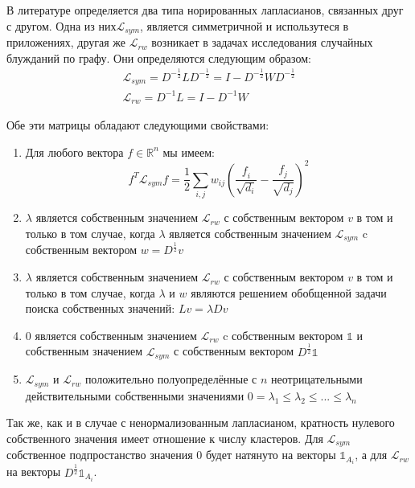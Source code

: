 В литературе определяется два типа норированных лапласианов, связанных друг с другом. Одна из них$\mathcal{L}_{sym}$, является симметричной и  использутеся в приложениях, другая же $\mathcal{L}_{rw}$ возникает в задачах исследования случайных блужданий по графу. Они определяются следующим образом:
\begin{equation}
\begin{array}{l}
	\mathcal{L}_{sym} = D^{-\frac12} L D^{-\frac12} = I - D^{-\frac12} W D^{-\frac12} \\
	\mathcal{L}_{rw} = D^{-1} L = I - D^{-1} W
\end{array}
\end{equation}

Обе эти матрицы обладают следующими свойствами:
\begin{enumerate}
	\item Для любого вектора $\mathit{f} \in \mathbb{R}^n$ мы имеем:
	\begin{equation}
		\mathit{f}^T \mathcal{L}_{sym} \mathit{f} = \frac12 \sum_{i,j} w_{ij}\left(\frac{\mathit{f}_i}{\sqrt{d_i}} - \frac{\mathit{f}_j}{\sqrt{d_j}}\right)^2
	\end{equation}
	\item $\lambda$ является собственным значением $\mathcal{L}_{rw}$ с собственным вектором $v$ в том и только в том случае, когда $\lambda$ является собственным значением $\mathcal{L}_{sym}$ c собственным вектором $w = D^{\frac12} v$
	\item $\lambda$ является собственным значением $\mathcal{L}_{rw}$ с собственным вектором $v$ в том и только в том случае, когда $\lambda$ и $w$ являются решением обобщенной задачи поиска собственных значений: $L v = \lambda D v$
	\item 0 является собственным значением $\mathcal{L}_{rw}$ c собственным вектором $\mathbb{1}$ и собственным значением $\mathcal{L}_{sym}$ с собственным вектором $D^{\frac12} \mathbb{1}$
	\item $\mathcal{L}_{sym}$ и $\mathcal{L}_{rw}$ положительно полуопределённые с $n$ неотрицательными действительными собственными значениями $0=\lambda_1 \leq \lambda_2 \leq ... \leq \lambda_n$
\end{enumerate}

Так же, как и в случае с ненормализованным лапласианом, кратность нулевого собственного значения имеет отношение к числу кластеров. Для $\mathcal{L}_{sym}$ собственное подпростанство значения 0 будет натянуто на векторы $\mathbb{1}_{A_i}$, а для $\mathcal{L}_{rw}$ на векторы $D^{\frac12} \mathbb{1}_{A_i}$.


